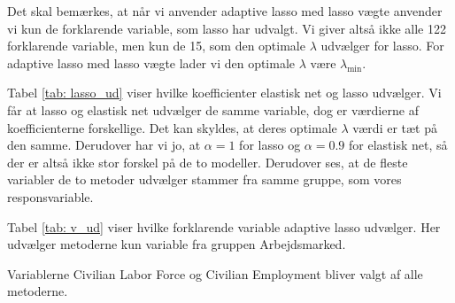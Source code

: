 Det skal bemærkes, at når vi anvender adaptive lasso med lasso vægte anvender vi kun de forklarende variable, som lasso har udvalgt. 
Vi giver altså ikke alle 122 forklarende variable, men kun de 15, som den optimale $\lambda$ udvælger for lasso.
For adaptive lasso med lasso vægte lader vi den optimale $\lambda$ være $\lambda_{\min}$.  

Tabel \ref{tab: lasso_ud} viser hvilke koefficienter elastisk net og lasso udvælger. 
Vi får at lasso og elastisk net udvælger de samme variable, dog er værdierne af koefficienterne forskellige. 
Det kan skyldes, at deres optimale $\lambda$ værdi er tæt på den samme. 
Derudover har vi jo, at $\alpha = 1$ for lasso og $\alpha = 0.9$ for elastisk net, så der er altså ikke stor forskel på de to modeller. 
Derudover ses, at de fleste variabler de to metoder udvælger stammer fra samme gruppe, som vores responsvariable.  

Tabel \ref{tab: v_ud} viser hvilke forklarende variable adaptive lasso udvælger. Her udvælger metoderne kun variable fra gruppen Arbejdsmarked. 

Variablerne Civilian Labor Force og Civilian Employment bliver valgt af alle metoderne. 



